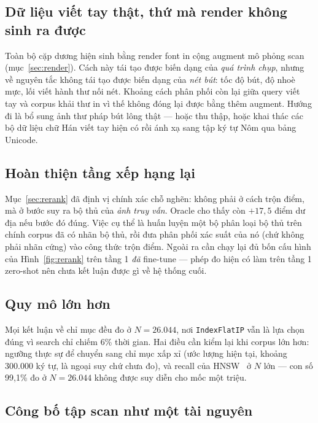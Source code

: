 \documentclass[conference,a4paper]{IEEEtran}
\newcommand{\code}[1]{{\small\texttt{#1}}}
\begin{document}
\subsection{Dữ liệu viết tay thật, thứ mà render không sinh ra được}

Toàn bộ cặp dương hiện sinh bằng render font in cộng augment mô phỏng scan (mục~\ref{sec:render}).
Cách này tái tạo được biến dạng của \emph{quá trình chụp}, nhưng về nguyên tắc không tái tạo được
biến dạng của \emph{nét bút}: tốc độ bút, độ nhoè mực, lối viết hành thư nối nét. Khoảng cách phân
phối còn lại giữa query viết tay và corpus khải thư in vì thế không đóng lại được bằng thêm augment.
Hướng đi là bổ sung ảnh thư pháp bút lông thật --- hoặc thu thập, hoặc khai thác các bộ dữ liệu chữ
Hán viết tay hiện có rồi ánh xạ sang tập ký tự Nôm qua bảng Unicode.

\subsection{Hoàn thiện tầng xếp hạng lại}

Mục~\ref{sec:rerank} đã định vị chính xác chỗ nghẽn: không phải ở cách trộn điểm, mà ở bước suy ra
bộ thủ của \emph{ảnh truy vấn}. Oracle cho thấy còn $+17{,}5$ điểm dư địa nếu bước đó đúng. Việc cụ
thể là huấn luyện một bộ phân loại bộ thủ trên chính corpus đã có nhãn bộ thủ, rồi đưa phân phối
xác suất của nó (chứ không phải nhãn cứng) vào công thức trộn điểm. Ngoài ra cần chạy lại đủ bốn
cấu hình của Hình~\ref{fig:rerank} trên tầng 1 \emph{đã} fine-tune --- phép đo hiện có làm trên tầng
1 zero-shot nên chưa kết luận được gì về hệ thống cuối.

\subsection{Quy mô lớn hơn}

Mọi kết luận về chỉ mục đều đo ở $N = 26.044$, nơi \code{IndexFlatIP} vẫn là lựa chọn đúng vì search
chỉ chiếm 6\% thời gian. Hai điều cần kiểm lại khi corpus lớn hơn: ngưỡng thực sự để chuyển sang chỉ
mục xấp xỉ (ước lượng hiện tại, khoảng 300.000 ký tự, là ngoại suy chứ chưa đo), và recall của
HNSW~\cite{hnsw} ở $N$ lớn --- con số 99,1\% đo ở $N = 26.044$ không được suy diễn cho mốc một triệu.

\subsection{Công bố tập scan như một tài nguyên}
\end{document}
